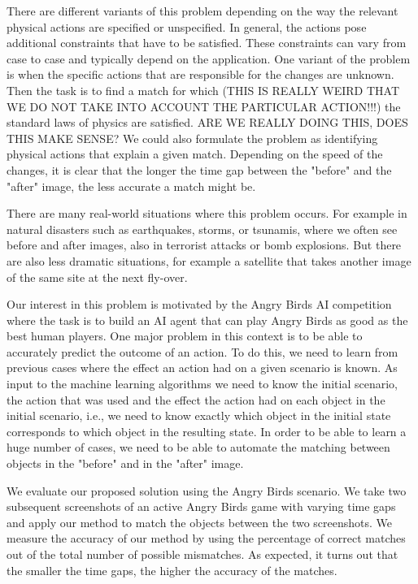 \documentclass[letterpaper]{article}
\begin{document}
There are different variants of this problem depending on the way the relevant physical actions are specified or unspecified. In general, the actions pose additional constraints that have to be satisfied. These constraints can vary from case to case and typically depend on the application. One variant of the problem is when the specific actions that are responsible for the changes are unknown. Then the task is to find a match for which (THIS IS REALLY WEIRD THAT WE DO NOT TAKE INTO ACCOUNT THE PARTICULAR ACTION!!!) the standard laws of physics are satisfied. ARE WE REALLY DOING THIS, DOES THIS MAKE SENSE?
We could also formulate the problem as identifying physical actions that explain a given match.
Depending on the speed of the changes, it is clear that the longer the time gap between the "before" and the "after" image, the less accurate a match might be.

There are many real-world situations where this problem occurs. For example in natural disasters such as earthquakes, storms, or tsunamis, where we often see before and after images, also in terrorist attacks or bomb explosions. But there are also less dramatic situations, for example a satellite that takes another image of the same site at the next fly-over.

Our interest in this problem is motivated by the Angry Birds AI competition\cite{abCompetition} where the task is to build an AI agent that can play Angry Birds as good as the best human players. One major problem in this context is to be able to accurately predict the outcome of an action. To do this, we need to learn from previous cases where the effect an action had on a given scenario is known. As input to the machine learning algorithms we need to know the initial scenario, the action that was used and the effect the action had on each object in the initial scenario, i.e., we need to know exactly which object in the initial state corresponds to which object in the resulting state. In order to be able to learn a huge number of cases, we need to be able to automate the matching between objects in the "before" and in the "after" image.

We evaluate our proposed solution using the Angry Birds scenario. We take two subsequent screenshots of an active Angry Birds game with varying time gaps and apply our method to match the objects between the two screenshots. We measure the accuracy of our method by using the percentage of correct matches out of the total number of possible mismatches. As expected, it turns out that the smaller the time gaps, the higher the accuracy of the matches.
\end{document}
